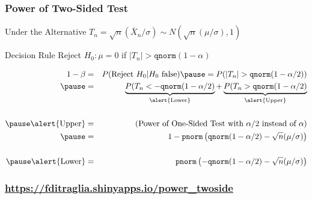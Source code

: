\documentclass{beamer}
\begin{document}
\begin{frame}
	\frametitle{Power of Two-Sided Test}
\footnotesize
\begin{block}
	{Under the Alternative}
	$T_n = \sqrt{n}(\bar{X}_n/\sigma) \sim N\left( \sqrt{n}(\mu/\sigma),1  \right)$
\end{block}
\begin{block}
	{Decision Rule}
	Reject $H_0\colon \mu = 0$ if $|T_n|> \texttt{qnorm}(1- \alpha)$  
\end{block}
\begin{eqnarray*}
	1 - \beta &=& P(\mbox{Reject } H_0|H_0 \mbox{ false}) \pause = P(|T_n| >\texttt{qnorm}(1- \alpha/2))\\ \pause
		&=&\underbrace{P(T_n < -\texttt{qnorm}(1- \alpha/2)}_{\text{\alert{Lower}}} + \underbrace{P(T_n >\texttt{qnorm}(1- \alpha/2)}_{\text{\alert{Upper}}}\\ \\ \pause
	\mbox{\alert{Upper}} &=& (\mbox{Power of One-Sided Test with } \alpha/2 \mbox{ instead of } \alpha)\\ \pause
		&=& 1 - \texttt{pnorm}\left( \texttt{qnorm}(1 - \alpha/2) - \sqrt{n}(\mu/\sigma) \right) \\ \\ \pause
	\mbox{\alert{Lower}} &=& \texttt{pnorm}\left(-\texttt{qnorm}(1 - \alpha/2) - \sqrt{n}(\mu/\sigma) \right) \\
\end{eqnarray*}

\end{frame}
\begin{frame}
	\frametitle{\href{https://fditraglia.shinyapps.io/power_twoside}{https://fditraglia.shinyapps.io/power\_twoside}}

\begin{figure}
\end{figure}

\end{frame}
\end{document}
